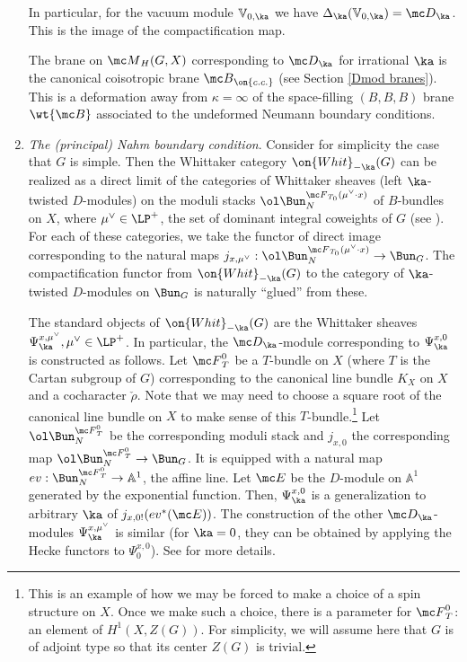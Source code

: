 \documentclass[11pt,reqno]{amsart}
\theoremstyle{plain}
\numberwithin{equation}{section}
\theoremstyle{definition}
\begin{document}
\begin{enumerate}
In particular, for the vacuum module ${\mathbb V}_{0,\ka}$ we have
$\Delta_\ka({\mathbb V}_{0,\ka}) = {\mc D}_\ka$. This is the image of
the compactification map.

The brane on ${\mc M}_H(G,X)$ corresponding to ${\mc D}_\ka$ for
irrational $\ka$ is the canonical coisotropic brane ${\mc B}_{\on{c.c.}}$
(see Section \ref{Dmod branes}).  This is a deformation away from
$\kappa=\infty$ of the space-filling $(B,B,B)$ brane $\wt{\mc B}$
associated to the undeformed Neumann boundary conditions.

\bigskip

\item {\em The (principal) Nahm boundary condition}. Consider for
  simplicity the case that $G$ is simple. Then the Whittaker category
  $\on{Whit}_{-\ka}(G)$ can be realized as a direct limit of the
  categories of Whittaker sheaves (left $\ka$-twisted $D$-modules) on
  the moduli stacks $\ol\Bun_N^{{\mc F}_{T_0}(\mu^\vee \cdot x)}$ of
  $B$-bundles on $X$, where $\mu^\vee \in \LP^+$, the set of dominant
  integral coweights of $G$ (see \cite{FGV}). For each of these
  categories, we take the functor of direct image corresponding to the
  natural maps $j_{x,\mu^\vee}: \ol\Bun_N^{{\mc F}_{T_0}(\mu^\vee
    \cdot x)} \to \Bun_G$. The compactification functor from
  $\on{Whit}_{-\ka}(G)$ to the category of $\ka$-twisted $D$-modules
  on $\Bun_G$ is naturally ``glued'' from these.

The standard objects of $\on{Whit}_{-\ka}(G)$ are the Whittaker
sheaves $\Psi^{x,\mu^\vee}_\ka, \mu^\vee \in \LP^+$. In particular,
the ${\mc D}_\ka$-module corresponding to $\Psi^{x,0}_\ka$ is
constructed as follows. Let ${\mc F}_T^0$ be a $T$-bundle on $X$
(where $T$ is the Cartan subgroup of $G$) corresponding to the
canonical line bundle $K_X$ on $X$ and a
cocharacter $\check\rho$. Note that we may need to choose a square
root of the canonical line bundle on $X$ to make sense of this
$T$-bundle.\footnote{This is an example of how we may be forced to
  make a choice of a spin structure on $X$. Once we make such a
  choice, there is a parameter for ${\mc F}_T^0$: an element of
  $H^1(X,Z(G))$. For simplicity, we will assume here that $G$ is of
  adjoint type so that its center $Z(G)$ is trivial.} Let
$\ol\Bun_N^{{\mc     F}_T^0}$ be the corresponding moduli stack and
$j_{x,0}$ the corresponding map $\ol\Bun_N^{{\mc F}_T^0} \to
\Bun_G$. It is equipped
with a natural map $ev: \Bun_N^{{\mc F}_T^0} \to {\mathbb A}^1$, the
affine line. Let ${\mc E}$ be the $D$-module on ${\mathbb A}^1$
generated by the exponential function. Then, $\Psi^{x,0}_\ka$ is a
generalization to arbitrary $\ka$ of $j_{x,0!}(ev^*({\mc E}))$. The
construction of the other ${\mc D}_\ka$-modules
$\Psi^{x,\mu^\vee}_\ka$ is similar (for $\ka=0$, they can be obtained
by applying the Hecke functors to $\Psi^{x,0}_0$). See
\cite{FGV,Gaitsgory,Beraldo,Raskin} for more details.


\end{enumerate}
\end{document}
